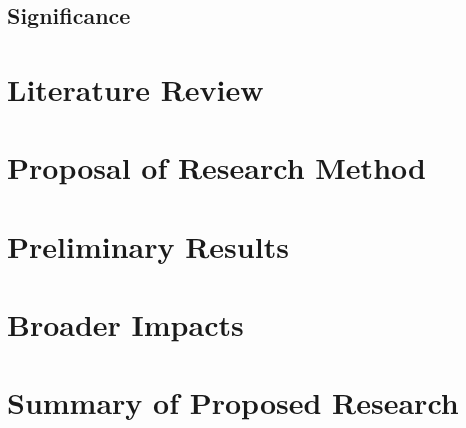 \subsection{Significance}

\section{Literature Review}

\section{Proposal of Research Method}

\section{Preliminary Results}

\section{Broader Impacts}

\section{Summary of Proposed Research}